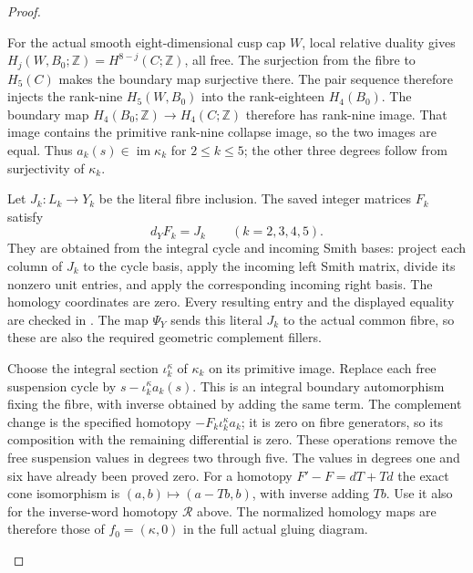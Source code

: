 \begin{proof}
\begin{enumerate}[label=\arabic*.]
For the actual smooth eight-dimensional cusp cap $W$, local relative
duality gives
$H_j(W,B_0;\mathbb Z)=H^{8-j}(C;\mathbb Z)$, all free.
The surjection from the fibre to $H_5(C)$ makes the boundary map
surjective there. The pair sequence therefore injects the rank-nine
$H_5(W,B_0)$ into the rank-eighteen $H_4(B_0)$.
The boundary map $H_4(B_0;\mathbb Z)\to H_4(C;\mathbb Z)$
therefore has rank-nine image. That image contains the primitive
rank-nine collapse image, so the two images are equal. Thus
$a_k(s)\in\operatorname{im}\kappa_k$ for $2\leq k\leq5$;
the other three degrees follow from surjectivity of $\kappa_k$.

Let $J_k:L_k\to Y_k$ be the literal fibre inclusion. The saved
integer matrices $F_k$ satisfy
\[
 d_YF_k=J_k\qquad(k=2,3,4,5).
\]
They are obtained from the integral cycle and incoming Smith bases:
project each column of $J_k$ to the cycle basis, apply the incoming
left Smith matrix, divide its nonzero unit entries, and apply the
corresponding incoming right basis. The homology coordinates are
zero. Every resulting entry and the displayed equality are checked
in .
The map $\Psi_Y$ sends this literal $J_k$ to the actual common
fibre, so these are also the required geometric complement fillers.

Choose the integral section $\iota_k^\kappa$ of $\kappa_k$ on
its primitive image. Replace each free suspension cycle by
$s-\iota_k^\kappa a_k(s)$. This is an integral boundary automorphism
fixing the fibre, with inverse obtained by adding the same term.
The complement change is the specified homotopy
$-F_k\iota_k^\kappa a_k$; it is zero on fibre generators, so
its composition with the remaining differential is zero.
These operations remove the free suspension values in degrees
two through five. The values in degrees one and six have already
been proved zero. For a homotopy $F'-F=dT+Td$ the exact cone
isomorphism is $(a,b)\mapsto(a-Tb,b)$, with inverse adding $Tb$.
Use it also for the inverse-word homotopy $\mathcal R$ above.
The normalized homology maps are therefore those of
$f_0=(\kappa,0)$ in the full actual gluing diagram.


\end{enumerate}
\end{proof}
